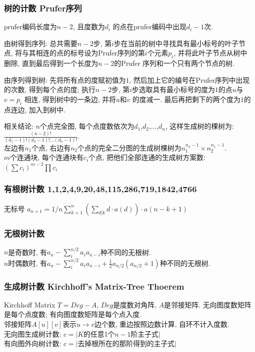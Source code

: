 \subsubsection{树的计数 Prufer序列}
    prufer编码长度为${n-2}$, 且度数为$d_i$ 的点在prufer编码中出现${d_i -1}$次. 
    \par 由树得到序列: 总共需要$n-2$步, 第$i$步在当前的树中寻找具有最小标号的叶子节点, 将与其相连的点的标号设为Prufer序列的第$i$个元素$p_i$, 并将此叶子节点从树中删除, 直到最后得到一个长度为$n-2$的Prufer 序列和一个只有两个节点的树. 
    \par 由序列得到树: 先将所有点的度赋初值为$1$, 然后加上它的编号在Prufer序列中出现的次数, 得到每个点的度; 执行$n-2$步, 第$i$步选取具有最小标号的度为$1$的点$u$与$v=p_i$ 相连, 得到树中的一条边, 并将$u$和$v$ 的度减一. 最后再把剩下的两个度为$1$的点连边, 加入到树中. 
    \par 相关结论: $n$个点完全图, 每个点度数依次为$d_1$,$d_2$,...,$d_n$, 这样生成树的棵树为: ${\frac{(n-2)!}{(d_1-1)!(d_2-1)!...(d_n-1)!}}$.\\
    左边有$n_1$个点, 右边有$n_2$个点的完全二分图的生成树棵树为$n_1^{n_2-1}\times n_2^{n_1-1}$. \\
    $m$个连通块, 每个连通块有$c_i$个点, 把他们全部连通的生成树方案数: $(\sum c_i)^{m-2}\prod c_i$
\subsubsection{有根树计数 1,1,2,4,9,20,48,115,286,719,1842,4766}\noindent
无标号 $a_{n+1} = 1/n  \sum_{k=1}^{n} ( \sum_{d|k} d \cdot a(d) ) \cdot a(n-k+1)$ 
\subsubsection{无根树计数}\noindent
    $n$是奇数时, 有$a_n-\sum_{i}^{n/2}a_ia_{n-i}$种不同的无根树. \\
    $n$时偶数时, 有$a_n-\sum_{i}^{n/2}a_ia_{n-i}+\frac{1}{2}a_{n/2}(a_{n/2}+1)$种不同的无根树. 
\subsubsection{生成树计数 Kirchhoff's Matrix-Tree Thoerem}
    Kirchhoff Matrix $T=Deg-A$, $Deg$是度数对角阵, $A$是邻接矩阵. 无向图度数矩阵是每个点度数; 有向图度数矩阵是每个点入度.\\
    邻接矩阵$A[u][v]$表示$u\rightarrow v$边个数, 重边按照边数计算, 自环不计入度数.\\
    无向图生成树计数: $c=|K$的任意1个$n-1$阶主子式$|$\\
    有向图外向树计数: $c=|$去掉根所在的那阶得到的主子式$|$
